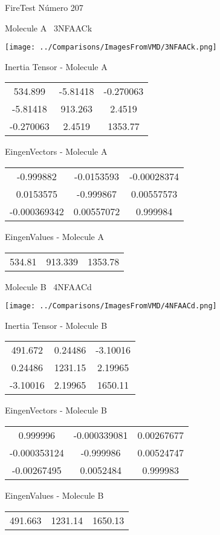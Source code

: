 \vtab[-3cm]
\begin{center}
{\large FireTest \tab Número 207}
\end{center}
\begin{multicols}{2}
\begin{center}

Molecule A \
3NFAACk

\texttt{[image: ../Comparisons/ImagesFromVMD/3NFAACk.png]}

Inertia Tensor - Molecule A \\
\begin{tabular}{|c c c|}
534.899	 & 	-5.81418	 & 	-0.270063	 \\
-5.81418	 & 	913.263	 & 	2.4519	 \\
-0.270063	 & 	2.4519	 & 	1353.77
\end{tabular}

\vtab
 EingenVectors - Molecule A     \\
\begin{tabular}{|c c c|}
-0.999882	 & 	-0.0153593	 & 	-0.00028374	 \\
0.0153575	 & 	-0.999867	 & 	0.00557573	 \\
-0.000369342	 & 	0.00557072	 & 	0.999984
\end{tabular}

\vtab
 EingenValues - Molecule A     \\
\begin{tabular}{|c c c|}
534.81	 & 	913.339	 & 	1353.78	 \\
\end{tabular}
\columnbreak

Molecule B \
4NFAACd

\texttt{[image: ../Comparisons/ImagesFromVMD/4NFAACd.png]}

Inertia Tensor - Molecule B \\
\begin{tabular}{|c c c|}
491.672	 & 	0.24486	 & 	-3.10016	 \\
0.24486	 & 	1231.15	 & 	2.19965	 \\
-3.10016	 & 	2.19965	 & 	1650.11
\end{tabular}

\vtab
 EingenVectors - Molecule B     \\
\begin{tabular}{|c c c|}
0.999996	 & 	-0.000339081	 & 	0.00267677	 \\
-0.000353124	 & 	-0.999986	 & 	0.00524747	 \\
-0.00267495	 & 	0.0052484	 & 	0.999983
\end{tabular}

\vtab
 EingenValues - Molecule B     \\
\begin{tabular}{|c c c|}
491.663	 & 	1231.14	 & 	1650.13	 \\
\end{tabular}

\end{center}
\end{multicols}

